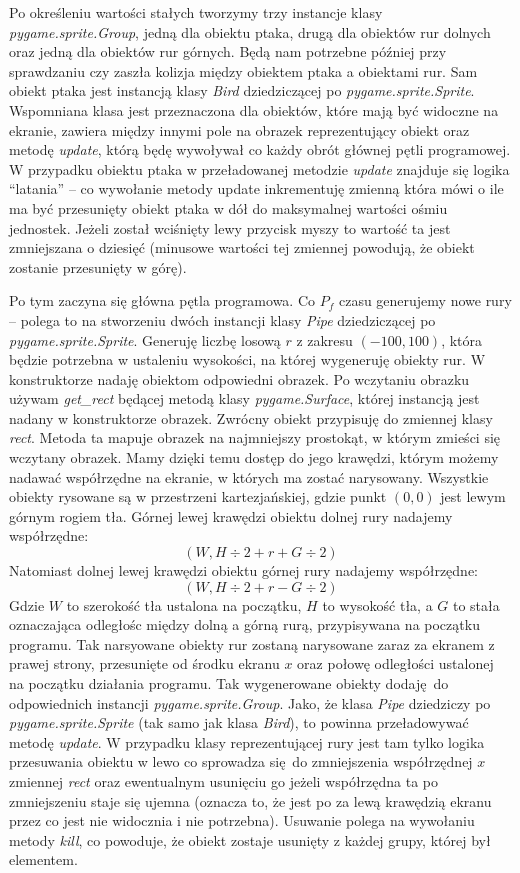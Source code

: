 \documentclass[a4paper,12pt,oneside]{book}
\begin{document}
Po określeniu wartości stałych tworzymy trzy instancje klasy
\textit{pygame.sprite.Group}, jedną dla obiektu ptaka, drugą dla obiektów rur
dolnych oraz jedną dla obiektów rur górnych. Będą nam potrzebne później przy
sprawdzaniu czy zaszła kolizja między obiektem ptaka a obiektami rur.
Sam obiekt ptaka jest instancją klasy \textit{Bird} dziedziczącej po
\textit{pygame.sprite.Sprite}. Wspomniana klasa jest przeznaczona dla obiektów,
które mają być widoczne na ekranie, zawiera między innymi
pole na obrazek reprezentujący obiekt oraz metodę
\textit{update}\cite{pygame_sprite_documentation}, którą będę wywoływał co
każdy obrót głównej pętli programowej. W przypadku obiektu ptaka w
przeładowanej metodzie \textit{update} znajduje się logika ``latania'' --
co wywołanie metody update inkrementuję zmienną która mówi o ile ma
być przesunięty obiekt ptaka w dół do maksymalnej wartości ośmiu jednostek.
Jeżeli został wciśnięty lewy przycisk myszy to wartość ta jest zmniejszana o
dziesięć (minusowe wartości tej zmiennej powodują, że obiekt zostanie
przesunięty w górę).

Po tym zaczyna się główna pętla programowa. Co $P_f$ czasu generujemy nowe rury
-- polega to na stworzeniu dwóch instancji klasy \textit{Pipe} dziedziczącej
po \textit{pygame.sprite.Sprite}. Generuję liczbę losową $r$ z zakresu
$(-100, 100)$, która będzie potrzebna w ustaleniu wysokości, na której 
wygeneruję obiekty rur. W konstruktorze nadaję obiektom odpowiedni
obrazek. Po wczytaniu obrazku używam \textit{get\_rect}
będącej metodą klasy \textit{pygame.Surface}, której instancją jest nadany w
konstruktorze obrazek. Zwrócny obiekt przypisuję do zmiennej klasy
\textit{rect}. Metoda ta mapuje obrazek na najmniejszy prostokąt, w
którym zmieści się wczytany obrazek. Mamy dzięki temu dostęp do jego krawędzi,
którym możemy nadawać współrzędne na ekranie, w których ma zostać narysowany.
Wszystkie obiekty rysowane są w przestrzeni kartezjańskiej, gdzie punkt
$(0,0)$ jest lewym górnym rogiem tła.
Górnej lewej krawędzi obiektu dolnej rury nadajemy współrzędne:
\[(W, H \div 2 + r + G \div 2)\]
Natomiast dolnej lewej krawędzi obiektu górnej rury nadajemy współrzędne:
\[(W, H \div 2 + r - G \div 2)\]
Gdzie $W$ to szerokość tła ustalona na początku, $H$ to wysokość tła, a
$G$ to stała oznaczająca odległośc między dolną a górną rurą, przypisywana
na początku programu. 
Tak narsyowane obiekty rur zostaną narysowane zaraz za ekranem z prawej strony,
przesunięte od środku ekranu $x$ oraz połowę odległości ustalonej na początku
działania programu. Tak wygenerowane obiekty dodaję do odpowiednich instancji
\textit{pygame.sprite.Group}. Jako, że klasa \textit{Pipe} dziedziczy po
\textit{pygame.sprite.Sprite} (tak samo jak klasa \textit{Bird}), to powinna
przeładowywać metodę \textit{update}\cite{pygame_sprite_documentation}.
W przypadku klasy reprezentującej rury jest tam tylko logika przesuwania
obiektu w lewo co sprowadza się do zmniejszenia współrzędnej $x$ 
zmiennej \textit{rect} oraz ewentualnym usunięciu go jeżeli współrzędna ta
po zmniejszeniu staje się ujemna (oznacza to, że jest po za lewą krawędzią
ekranu przez co jest nie widocznia i nie potrzebna). Usuwanie polega na
wywołaniu metody \textit{kill}, co powoduje, że obiekt zostaje usunięty
z każdej grupy, której był elementem.
\end{document}
